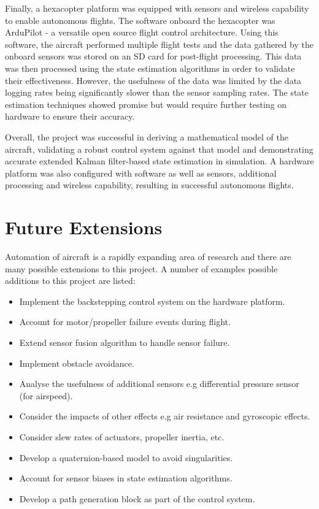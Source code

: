 Finally, a hexacopter platform was equipped with sensors and wireless capability to enable autonomous flights. The software onboard the hexacopter was ArduPilot - a versatile open source flight control architecture. Using this software, the aircraft performed multiple flight tests and the data gathered by the onboard sensors was stored on an SD card for post-flight processing. This data was then processed using the state estimation algorithms in order to validate their effectiveness. However, the usefulness of the data was limited by the data logging rates being significantly slower than the sensor sampling rates. The state estimation techniques showed promise but would require further testing on hardware to ensure their accuracy.


Overall, the project was successful in deriving a mathematical model of the aircraft, validating a robust control system against that model and demonstrating accurate extended Kalman filter-based state estimation in simulation. A hardware platform was also configured with software as well as sensors, additional processing and wireless capability, resulting in successful autonomous flights.


\section{Future Extensions}
Automation of aircraft is a rapidly expanding area of research and there are many possible extensions to this project. A number of examples possible additions to this project are listed:

\begin{itemize}
\item Implement the backstepping control system on the hardware platform.
\item Account for motor/propeller failure events during flight.
\item Extend sensor fusion algorithm to handle sensor failure.
\item Implement obstacle avoidance.
\item Analyse the usefulness of additional sensors e.g differential pressure sensor (for airspeed).
\item Consider the impacts of other effects e.g air resistance and gyroscopic effects.
\item Consider slew rates of actuators, propeller inertia, etc.
\item Develop a quaternion-based model to avoid singularities.
\item Account for sensor biases in state estimation algorithms.
\item Develop a path generation block as part of the control system.


\end{itemize}

\clearpage


